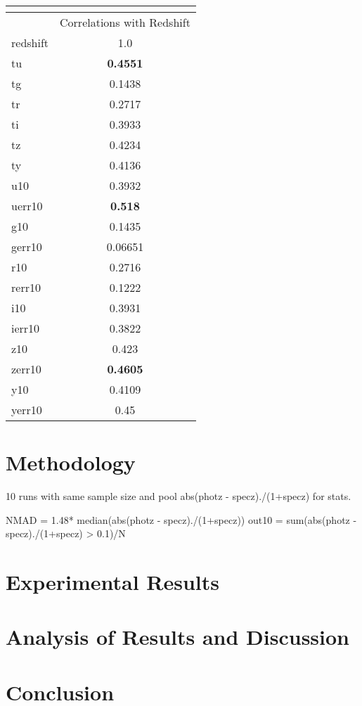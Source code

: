\documentclass[13pt]{amsart}
\begin{document}
    \begin{center}
    \begin{tabular}{|l|c|}
      \multicolumn{2}{c}{} \\ \hline
       & Correlations with Redshift \\ \hline
      redshift & 1.0 \\ \hline
      tu & \textbf{0.4551} \\ \hline
      tg & 0.1438 \\ \hline
      tr & 0.2717 \\ \hline
      ti & 0.3933 \\ \hline
      tz & 0.4234 \\ \hline
      ty & 0.4136 \\ \hline
      u10 & 0.3932 \\ \hline
      uerr10 & \textbf{0.518} \\ \hline
      g10 & 0.1435 \\ \hline
      gerr10 & 0.06651 \\ \hline
      r10 & 0.2716 \\ \hline
      rerr10 & 0.1222 \\ \hline
      i10 & 0.3931 \\ \hline
      ierr10 & 0.3822 \\ \hline
      z10 & 0.423 \\ \hline
      zerr10 & \textbf{0.4605} \\ \hline
      y10 & 0.4109 \\ \hline
      yerr10 & 0.45 \\ \hline
    \end{tabular}
    \end{center}


\section{Methodology}
  10 runs with same sample size and pool abs(photz - specz)./(1+specz) for stats.

  NMAD = 1.48* median(abs(photz - specz)./(1+specz))
  out10 = sum(abs(photz - specz)./(1+specz) > 0.1)/N



\section{Experimental Results}




\section{Analysis of Results and Discussion}



\section{Conclusion}
\end{document}
